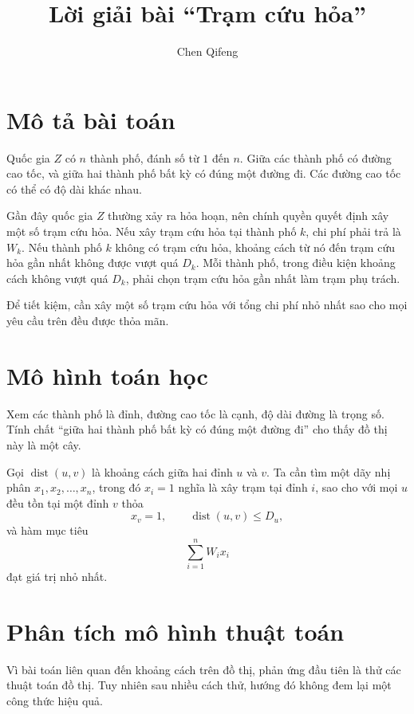 \documentclass[11pt]{article}
\title{Lời giải bài ``Trạm cứu hỏa''}
\author{Chen Qifeng}
\date{}
\begin{document}
\maketitle


\section{Mô tả bài toán}

Quốc gia \(Z\) có \(n\) thành phố, đánh số từ \(1\) đến \(n\). Giữa các
thành phố có đường cao tốc, và giữa hai thành phố bất kỳ có đúng một đường đi.
Các đường cao tốc có thể có độ dài khác nhau.

Gần đây quốc gia \(Z\) thường xảy ra hỏa hoạn, nên chính quyền quyết định xây
một số trạm cứu hỏa. Nếu xây trạm cứu hỏa tại thành phố \(k\), chi phí phải
trả là \(W_k\). Nếu thành phố \(k\) không có trạm cứu hỏa, khoảng cách từ nó
đến trạm cứu hỏa gần nhất không được vượt quá \(D_k\). Mỗi thành phố, trong
điều kiện khoảng cách không vượt quá \(D_k\), phải chọn trạm cứu hỏa gần nhất
làm trạm phụ trách.

Để tiết kiệm, cần xây một số trạm cứu hỏa với tổng chi phí nhỏ nhất sao cho
mọi yêu cầu trên đều được thỏa mãn.

\section{Mô hình toán học}

Xem các thành phố là đỉnh, đường cao tốc là cạnh, độ dài đường là trọng số.
Tính chất ``giữa hai thành phố bất kỳ có đúng một đường đi'' cho thấy đồ thị
này là một cây.

Gọi \(\operatorname{dist}(u,v)\) là khoảng cách giữa hai đỉnh \(u\) và \(v\).
Ta cần tìm một dãy nhị phân \(x_1,x_2,\ldots,x_n\), trong đó \(x_i=1\) nghĩa
là xây trạm tại đỉnh \(i\), sao cho với mọi \(u\) đều tồn tại một đỉnh \(v\)
thỏa
\[
  x_v=1,\qquad \operatorname{dist}(u,v)\le D_u,
\]
và hàm mục tiêu
\[
  \sum_{i=1}^{n} W_i x_i
\]
đạt giá trị nhỏ nhất.

\section{Phân tích mô hình thuật toán}

Vì bài toán liên quan đến khoảng cách trên đồ thị, phản ứng đầu tiên là thử
các thuật toán đồ thị. Tuy nhiên sau nhiều cách thử, hướng đó không đem lại
một công thức hiệu quả.
\end{document}

